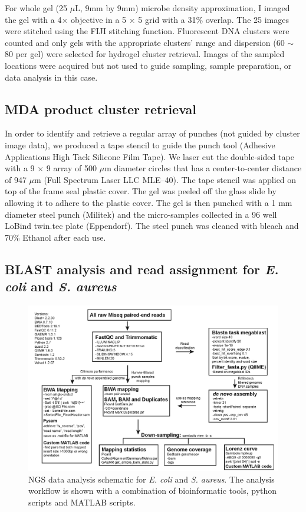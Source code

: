 For whole gel (25 $\mu$L, 9mm by 9mm) microbe density approximation, I imaged the gel with a 4$\times$ objective in a 5 $\times$ 5 grid with a 31\% overlap. The 25 images were stitched using the FIJI stitching function. Fluorescent DNA clusters were counted and only gels with the appropriate clusters' range and dispersion (60 $\sim$ 80 per gel) were selected for hydrogel cluster retrieval. Images of the sampled locations were acquired but not used to guide sampling, sample preparation, or data analysis in this case.

\subsection{MDA product cluster retrieval}
In order to identify and retrieve a regular array of punches (not guided by cluster image data), we produced a tape stencil to guide the punch tool (Adhesive Applications High Tack Silicone Film Tape). We laser cut the double-sided tape with a 9 $\times$  9 array of 500 $\mu$m diameter circles that has a center-to-center distance of 947 $\mu$m (Full Spectrum Laser LLC MLE--40). The tape stencil was applied on top of the frame seal plastic cover. The gel was peeled off the glass slide by allowing it to adhere to the plastic cover. The gel is then punched with a 1 mm diameter steel punch (Militek) and the micro-samples collected in a 96 well LoBind twin.tec plate (Eppendorf). The steel punch was cleaned with bleach and 70\% Ethanol after each use.

\subsection{BLAST analysis and read assignment for \textit{E. coli} and \textit{S. aureus}}

\begin{figure}
\centering
\includegraphics[keepaspectratio,width=1\textwidth]{./figures/SuppFig6.jpg}
\caption[NGS data analysis schematic for \textit{E. coli} and \textit{S. aureus}]{NGS data analysis schematic for \textit{E. coli} and \textit{S. aureus}. The analysis workflow is shown with a combination of bioinformatic tools, python scripts and MATLAB scripts.}
\label{fig:ESDataAnalysis}
\end{figure}

